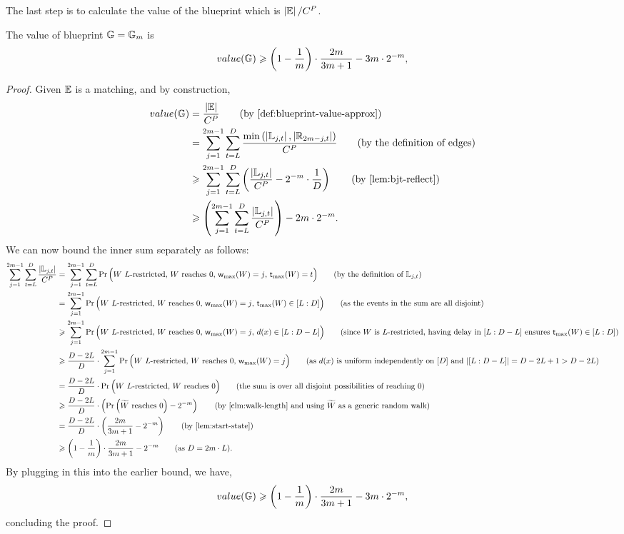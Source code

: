 The last step is to calculate the value of the blueprint which is $\left\vert{\mathbb{E}}\right\vert/C^P$. 

\begin{lemma}\label{lem:value}
	The value of blueprint $\mathbb{G}=\mathbb{G}_m$ is 
	\[
		value(\mathbb{G}) \geqslant \left(1-\frac{1}{m}\right) \cdot \frac{2m}{3m+1}-3m \cdot 2^{-m}, 
	\]
\end{lemma}
\begin{proof}
	Given $\mathbb{E}$ is a matching, and by construction, 
	\begin{align*}
		value(\bG) &= \frac{\card{\bE}}{C^P} \tag{by~\Cref{def:blueprint-value-approx}} \\
		&= \sum_{j=1}^{2m-1} \sum_{t = L}^{D} \frac{\min\paren{\card{\bL_{j,t}},\card{\bR_{2m-j,t}}}}{C^P} \tag{by the definition of edges} \\
		&\geq \sum_{j=1}^{2m-1} \sum_{t = L}^{D} \paren{\frac{\card{\bL_{j,t}}}{C^P} - 2^{-m} \cdot \frac{1}{D}} \tag{by~\Cref{lem:bjt-reflect}} \\
		&\geq \paren{\sum_{j=1}^{2m-1} \sum_{t = L}^{D} \frac{\card{\bL_{j,t}}}{C^P}} - 2m \cdot 2^{-m}. 
	\end{align*}
	We can now bound the inner sum separately as follows:
	\begin{align*}
		\sum_{j=1}^{2m-1} \sum_{t = L}^{D} \frac{\card{\bL_{j,t}}}{C^P} &= \sum_{j=1}^{2m-1} \sum_{t = L}^{D} \Pr\Paren{\text{$W$ $L$-restricted, $W$ reaches $0$, $\maxwalk{W}=j$, $\timemax{W} = t$}} \tag{by the definition of $\bL_{j,t}$} \\
		&= \sum_{j=1}^{2m-1} \Pr\Paren{\text{$W$ $L$-restricted, $W$ reaches $0$, $\maxwalk{W}=j$, $\timemax{W} \in [L:D]$}} \tag{as the events in the sum are all disjoint} \\
		&\geq \sum_{j=1}^{2m-1} \Pr\Paren{\text{$W$ $L$-restricted, $W$ reaches $0$, $\maxwalk{W}=j$, $d(x) \in [L:D-L]$}} \tag{since $W$ is $L$-restricted, having delay in $[L:D-L]$ ensures $\timemax{W} \in [L:D]$} \\
		&\geq \frac{D-2L}{D} \cdot \sum_{j=1}^{2m-1} \Pr\Paren{\text{$W$ $L$-restricted, $W$ reaches $0$, $\maxwalk{W}=j$}} \tag{as $d(x)$ is uniform independently on $[D]$ and $\card{[L:D-L]} = D-2L+1 > D-2L$} \\
		&= \frac{D-2L}{D} \cdot \Pr\Paren{\text{$W$ $L$-restricted, $W$ reaches $0$}} \tag{the sum is over all disjoint possibilities of reaching $0$} \\
		&\geq \frac{D-2L}{D} \cdot  \paren{\Pr\Paren{\text{$\widetilde W$ reaches $0$}}-2^{-m}} \tag{by~\Cref{clm:walk-length} and using $\widetilde W$ as a generic random walk} \\
		&= \frac{D-2L}{D} \cdot \paren{\frac{2m}{3m+1}-2^{-m}} \tag{by~\Cref{lem:start-state}} \\
		&\geq \paren{1-\frac{1}{m}} \cdot \frac{2m}{3m+1}-2^{-m} \tag{as $D = 2m \cdot L$}. 
	\end{align*}
	By plugging in this into the earlier bound, we have, 
	\[
		value(\mathbb{G}) \geqslant \left(1-\frac{1}{m}\right) \cdot \frac{2m}{3m+1}- 3m \cdot 2^{-m}, 
	\]
	concluding the proof. 
\end{proof}

